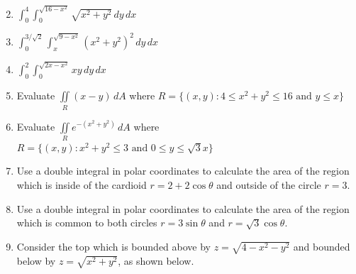 \documentclass[12pt]{article}
\newif\ifans
\begin{document}

\begin{enumerate}
\setcounter{enumi}{1}

\item $\int_0^{4} \int_0^{\sqrt{16-x^2}} \sqrt{x^2+y^2} \,dy \,dx$

\ifans{\fbox{$\frac{32\pi}{3}$}} \fi

\item $\int_0^{3/\sqrt{2}} \int_x^{\sqrt{9-x^2}} \left(x^2+y^2\right)^2 \,dy \,dx$

\ifans{\fbox{$\frac{243}{8}\pi$}} \fi

\item $\int_0^{2} \int_0^{\sqrt{2x-x^2}} xy \,dy \,dx$

\ifans{\fbox{$\frac{2}{3}$}} \fi

\item Evaluate $\iint \limits_{R} (x-y) \,dA$ where $R=\{(x,y): 4 \leq x^2+y^2 \leq 16 \text{ and } y \leq x\}$

\ifans{\fbox{$\frac{112}{3}\sqrt{2}$}} \fi

\item Evaluate $\iint \limits_{R} e^{-(x^2+y^2)} \,dA$ where $R=\{(x,y): x^2+y^2 \leq 3 \text{ and } 0 \leq y \leq \sqrt{3}x\}$

\ifans{\fbox{$\frac{\pi}{6}\left(1-\frac{1}{e^3}\right)$}} \fi

\item Use a double integral in polar coordinates to calculate the area of the region which is inside of the cardioid $r=2+2\cos{\theta}$ and outside of the circle $r=3$.

\ifans{\fbox{$\frac{9\sqrt{3}}{2}-\pi$}} \fi

\item Use a double integral in polar coordinates to calculate the area of the region which is common to both circles $r=3\sin{\theta}$ and $r=\sqrt{3}\cos{\theta}$.

\ifans{\fbox{$\frac{5\pi}{8}-\frac{3\sqrt{3}}{4}$; Detailed Solution: \textcolor{blue}{\href{http://www.math.drexel.edu/classes/Calculus/resources/Math200HW/Solutions/18_200_DI_Polar_08.pdf}{Here}}}} \fi

\newpage

\item Consider the top which is bounded above by $z=\sqrt{4-x^2-y^2}$ and bounded below by $z=\sqrt{x^2+y^2}$, as shown below.


\end{enumerate}
\end{document}
